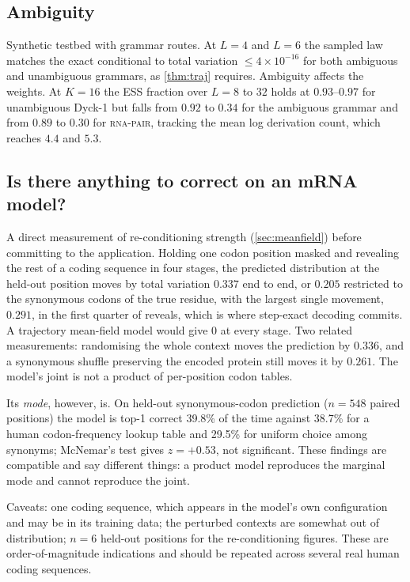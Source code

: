 \documentclass[11pt]{article}
\theoremstyle{definition}
\begin{document}
\subsection{Ambiguity}\label{sec:expamb}
Synthetic testbed with grammar routes. At $L=4$ and $L=6$ the sampled law matches the exact conditional to total
variation $\le4\times10^{-16}$ for both ambiguous and unambiguous grammars, as \cref{thm:traj} requires. Ambiguity
affects the weights.
At $K=16$ the ESS fraction over $L=8$ to $32$ holds at $0.93$--$0.97$ for unambiguous Dyck-1 but falls from $0.92$
to $0.34$ for the ambiguous grammar and from $0.89$ to $0.30$ for \textsc{rna-pair}, tracking the mean log
derivation count, which reaches $4.4$ and $5.3$.

\subsection{Is there anything to correct on an mRNA model?}\label{sec:expmrna}
A direct measurement of re-conditioning strength (\cref{sec:meanfield}) before committing to the application.
Holding one codon position masked and revealing the rest of a coding sequence in four stages, the predicted
distribution at the held-out position moves by total variation $0.337$ end to end, or $0.205$ restricted to the
synonymous codons of the true residue, with the largest single movement, $0.291$, in the first quarter of
reveals, which is where step-exact decoding commits. A trajectory mean-field model would give 0 at every stage.
Two related measurements: randomising the whole context moves the prediction by $0.336$, and a synonymous shuffle
preserving the encoded protein still moves it by $0.261$. The model's joint is not a product of per-position
codon tables.

Its \emph{mode}, however, is. On held-out synonymous-codon prediction ($n=548$ paired positions) the model is
top-1 correct 39.8\% of the time against 38.7\% for a human codon-frequency lookup table and 29.5\% for uniform
choice among synonyms; McNemar's test gives $z=+0.53$, not significant. These findings are compatible and say
different things: a product model reproduces the marginal mode and cannot reproduce the joint.

Caveats: one coding sequence, which appears in the model's own configuration and may be in its training data;
the perturbed contexts are somewhat out of distribution; $n=6$ held-out positions for the re-conditioning figures.
These are order-of-magnitude indications and should be repeated across several real human coding sequences.
\end{document}
